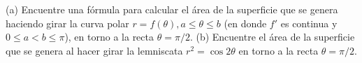 \item (a) Encuentre una fórmula para calcular el área de la superficie que se genera haciendo girar la curva polar $r = f(\theta), a \le \theta \le b$ (en donde $f'$ es continua y $0 \le a < b \le \pi$), en torno a la recta $\theta = \pi/2$.
    (b) Encuentre el área de la superficie que se genera al hacer girar la lemniscata $r^2 = \cos 2\theta$ en torno a la recta $\theta = \pi/2$.
